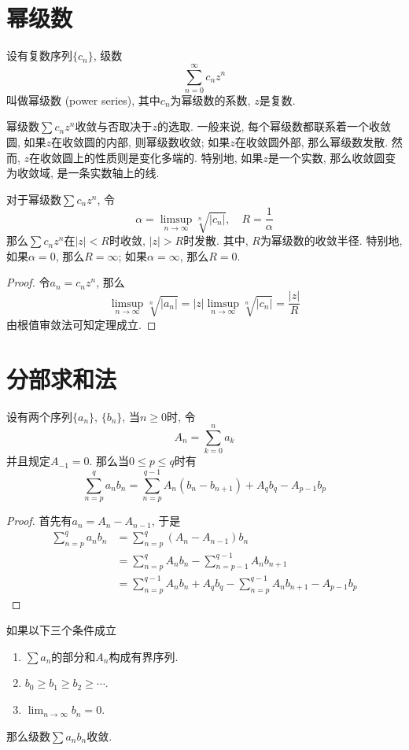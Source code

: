\documentclass[cn,12pt,math=mtpro2,citestyle=gb7714-2015,bibstyle=gb7714-2015,twocol]{elegantbook}
\newcommand{\limn }{\lim_{n\to\infty}}
\begin{document}
\section{幂级数}
\begin{definition}
设有复数序列$\{c_n\}$, 级数
$$\sum_{n=0}^{\infty}c_nz^n$$
叫做幂级数 (power series), 其中$c_n$为幂级数的系数, $z$是复数.
\end{definition}
幂级数$\sum c_nz^n$收敛与否取决于$z$的选取. 一般来说, 每个幂级数都联系着一个收敛圆, 如果$z$在收敛圆的内部, 则幂级数收敛; 如果$z$在收敛圆外部, 那么幂级数发散. 然而, $z$在收敛圆上的性质则是变化多端的. 特别地, 如果$z$是一个实数, 那么收敛圆变为收敛域, 是一条实数轴上的线.
\begin{theorem}\label{thm:th3.16}
  对于幂级数$\sum c_nz^n$, 令
  $$\alpha=\limsup_{n\to\infty}\sqrt[n]{|c_n|},\quad R=\frac{1}{\alpha}$$
  那么$\sum c_nz^n$在$|z|<R$时收敛, $|z|>R$时发散.  其中, $R$为幂级数的收敛半径. 特别地, 如果$\alpha=0$, 那么$R=\infty$; 如果$\alpha=\infty$, 那么$R=0$.
\end{theorem}
\begin{proof}
  令$a_n=c_nz^n$, 那么
  $$\limsup_{n\to\infty} \sqrt[n]{|a_n|}=|z|\limsup_{n\to\infty} \sqrt[n]{|c_n|}=\frac{|z|}{R}$$
  由根值审敛法可知定理成立.

\end{proof}

\section{分部求和法}
\begin{theorem}\label{thm:th3.13}
  设有两个序列$\{a_n\}$, $\{b_n\}$, 当$n\geq 0$时, 令
  $$A_n=\sum_{k=0}^{n}a_k$$
  并且规定$A_{-1}=0$. 那么当$0\leq p \leq q$时有
  $$\sum_{n=p}^{q}a_nb_n=\sum_{n=p}^{q-1}A_n(b_n-b_{n+1})+A_qb_q-A_{p-1}b_p$$
\end{theorem}
\begin{proof}
  首先有$a_n=A_n-A_{n-1}$, 于是
  \begin{align*}
  \sum_{n=p}^{q}a_nb_n&=\sum_{n=p}^{q}(A_n-A_{n-1})b_n \\
  &=\sum_{n=p}^{q}A_nb_n-\sum_{n=p-1}^{q-1}A_nb_{n+1} \\
  &=\sum_{n=p}^{q-1}A_nb_n+A_qb_q-\sum_{n=p}^{q-1}A_nb_{n+1}-A_{p-1}b_p
  \end{align*}

\end{proof}
\begin{theorem}[Dirichlet判别法]\label{thm:th3.14}
  如果以下三个条件成立
  \begin{enumerate}[label=(\arabic*)]
  \item $\sum a_n$的部分和$A_n$构成有界序列.

  \item $b_0\geq b_1\geq b_2\geq \cdots$.

  \item $\displaystyle\limn b_n=0$.
  \end{enumerate}
  那么级数$\sum a_nb_n$收敛.
\end{theorem}
\end{document}
